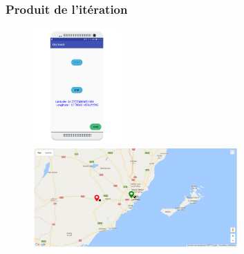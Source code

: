 \documentclass{beamer}
\begin{document}
\begin{frame}
    \frametitle{Produit de l'itération}
    \begin{figure}
        \includegraphics[width=0.3\textwidth]{./figures/sprint1-android-screenshot}
        \includegraphics[width=0.7\textwidth]{./figures/sprint1-dashboard-screenshot}
    \end{figure}
\end{frame}
\end{document}
